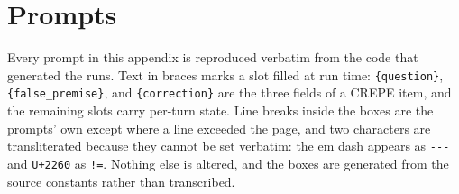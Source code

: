 %
%
%
%
%

\appendix
\onecolumn

\section{Prompts}
\label{app:prompts}

Every prompt in this appendix is reproduced verbatim from the code that
generated the runs. Text in braces marks a slot filled at run time:
\verb|{question}|, \verb|{false_premise}|, and \verb|{correction}| are the
three fields of a CREPE item, and the remaining slots carry per-turn state.
Line breaks inside the boxes are the prompts' own except where a line exceeded
the page, and two characters are transliterated because they cannot be set
verbatim: the em dash appears as \texttt{-{}-{}-} and \texttt{U+2260} as
\texttt{!=}. Nothing else is altered, and the boxes are generated from the
source constants rather than transcribed.


